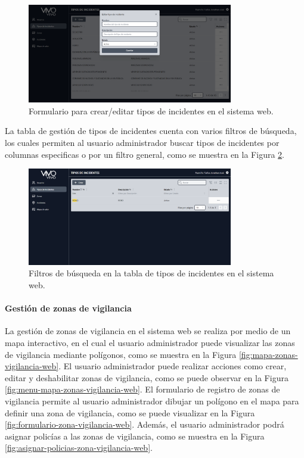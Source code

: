 \begin{figure}[H]
    \centering
    \includegraphics[width=0.8\textwidth]{chapters/III-resultados-y-discusion/resources/images/formulario-tipo-incidente-web.png}
    \caption{Formulario para crear/editar tipos de incidentes en el sistema web.}
    \label{fig:formulario-tipo-incidente-web}
\end{figure}

La tabla de gestión de tipos de incidentes cuenta con varios filtros de búsqueda, los cuales permiten al usuario administrador buscar
tipos de incidentes por columnas especificas o por un filtro general, como se muestra en la Figura \ref{fig:filtros-tabla-tipos-incidentes-web}.

\begin{figure}[H]
    \centering
    \includegraphics[width=0.8\textwidth]{chapters/III-resultados-y-discusion/resources/images/filtros-tabla-tipos-incidentes-web.png}
    \caption{Filtros de búsqueda en la tabla de tipos de incidentes en el sistema web.}
    \label{fig:filtros-tabla-tipos-incidentes-web}
\end{figure}

\paragraph{Gestión de zonas de vigilancia}

La gestión de zonas de vigilancia en el sistema web se realiza por medio de un mapa interactivo, en el cual el usuario administrador
puede visualizar las zonas de vigilancia mediante polígonos, como se muestra en la Figura \ref{fig:mapa-zonas-vigilancia-web}.
El usuario administrador puede realizar acciones como crear, editar y deshabilitar zonas de vigilancia, como se puede observar en la Figura
\ref{fig:menu-mapa-zonas-vigilancia-web}. El formulario de registro de zonas de vigilancia permite al usuario administrador dibujar
un polígono en el mapa para definir una zona de vigilancia, como se puede visualizar en la Figura \ref{fig:formulario-zona-vigilancia-web}.
Además, el usuario administrador podrá asignar policías a las zonas de vigilancia, como se muestra en la Figura
\ref{fig:asignar-policias-zona-vigilancia-web}.

